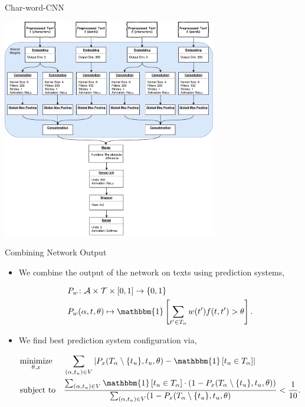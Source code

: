 \documentclass[10pt]{beamer}
\begin{document}
\begin{frame}[fragile]{Char-word-CNN}
    \begin{center}
        \includegraphics[width=0.7\textwidth]{../../report/pictures/experiments/conv_char_word_nn/model}
    \end{center}
\end{frame}

\begin{frame}[fragile]{Combining Network Output}
    \begin{itemize}
        \item We combine the output of the network on texts using prediction
            systems,

        \begin{align*}
            &P_w \colon \mathcal{A} \times \mathcal{T} \times [0, 1] \rightarrow
                \{0, 1\} \\
            &P_w(\alpha, t, \theta) \mapsto \mathbbm{1}\left[
                    \sum_{t' \in T_\alpha} w(t') f(t, t') > \theta
                \right].
        \end{align*}

        \item We find best prediction system configuration via,

        \begin{equation*}
            \begin{aligned}
                & \underset{\theta, x}{\text{minimize}}
                & & \sum_{(\alpha, t_u) \in V} \left|
                    P_x(T_\alpha \setminus \{t_u\}, t_u, \theta) -
                    \mathbbm{1}\left[t_u \in T_\alpha\right]
                \right| \\
                & \text{subject to}
                & & \frac{\sum_{(\alpha, t_u) \in V} \mathbbm{1}\left[t_u \in T_\alpha\right] \cdot
                    \left(1 - P_x(T_\alpha \setminus \{t_u\}, t_u, \theta)\right)}
        {\sum_{(\alpha, t_u) \in V} (1 - P_x(T_\alpha \setminus \{t_u\}, t_u, \theta)} <
                    \frac{1}{10}.
            \end{aligned}
        \end{equation*}
    \end{itemize}
\end{frame}
\end{document}
